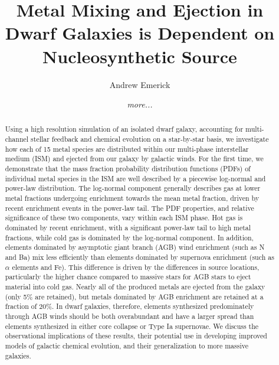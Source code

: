 \documentclass[twocolumn]{aastex61}
\begin{document}

\title{Metal Mixing 
    and Ejection
in Dwarf Galaxies is Dependent on Nucleosynthetic Source}


\author{Andrew Emerick}
\author{{\it more...}}


\begin{abstract}
Using a high resolution simulation of an isolated dwarf galaxy, accounting for 
    multi-channel 
stellar feedback and chemical evolution on a star-by-star basis, we investigate how each of 15 metal species are distributed within our multi-phase interstellar medium (ISM) and ejected from our galaxy 
    by
galactic winds. For the first time, we demonstrate that the mass fraction probability distribution functions (PDFs) of individual metal species in the ISM are well described by a piecewise log-normal 
   and
power-law distribution. The log-normal component generally describes gas at lower metal fractions undergoing enrichment towards the mean metal fraction, driven by recent enrichment events in the power-law tail. The PDF properties, and relative significance of these two components, vary within each ISM phase. Hot gas is dominated by recent enrichment, with a significant power-law tail to high metal fractions, while cold gas is dominated by the log-normal component. In addition, elements dominated by asymptotic giant branch (AGB) wind enrichment (such as N and Ba) mix less efficiently than elements dominated by supernova enrichment (such as $\alpha$ elements and Fe). This difference is driven by the differences in 
    source locations, particularly the higher chance compared to massive stars for AGB stars to eject material into cold gas.
Nearly all of the produced metals are ejected from the galaxy (only 5\% are retained), but metals dominated by AGB enrichment are retained at a fraction of 20\%. In dwarf galaxies, therefore, elements synthesized predominately through AGB winds should be both overabundant and have a larger spread than elements synthesized in either core collapse or Type Ia supernovae. We discuss the observational implications of these results, their potential use in developing improved models of galactic chemical evolution, and their generalization to more massive galaxies.
\end{abstract}
\end{document}
